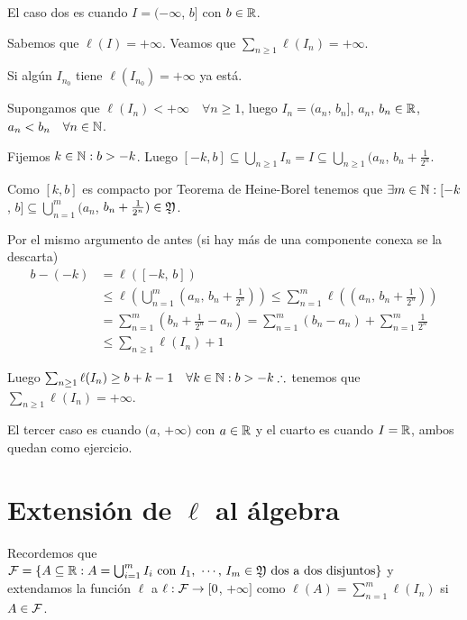 El caso dos es cuando \(I = (-\infty\), \(b]\) con \(b \in \mathbb{R}\).

Sabemos que \(\ell(I) = +\infty\). Veamos que \(\sum_{n \geq 1} \ell(I_n) = +\infty\).

Si algún \(I_{n_0}\) tiene \(\ell(I_{n_0}) = +\infty\) ya está.

Supongamos que \(\ell(I_n) < +\infty \quad \forall n \geq 1\), luego \(I_n = (a_n\), \(b_n]\), \(a_n\), \(b_n \in \mathbb{R}\), \(a_n < b_n \quad \forall n \in \mathbb{N}\).

Fijemos \(k \in \mathbb{N} : b > -k\). Luego \([-k, b] \subseteq \bigcup_{n \geq 1} I_n = I \subseteq \bigcup_{n \geq 1} (a_n\), \(b_n + \frac{1}{2^n}\).

Como \([k, b]\) es compacto por Teorema de Heine-Borel tenemos que \(\exists m \in \mathbb{N} : [-k\), \(b] \subseteq \bigcup_{n = 1}^m (a_n\), \(b_n + \frac{1}{2^n}) \in \mathfrak{Y}\).

Por el mismo argumento de antes (si hay más de una componente conexa se la descarta) \begin{align*}
    b - (-k) & = \ell([-k \text{, } b])                                                                                                     \\
             & \leq \ell(\bigcup_{n = 1}^m (a_n\text{, } b_n + \frac{1}{2^n})) \leq \sum_{n = 1}^m \ell((a_n\text{, } b_n + \frac{1}{2^n})) \\
             & = \sum_{n = 1}^m (b_n + \frac{1}{2^n} - a_n) = \sum_{n = 1}^m (b_n - a_n) + \sum_{n = 1}^m \frac{1}{2^n}                     \\
             & \leq \sum_{n \geq 1} \ell(I_n) + 1
\end{align*}

Luego \(\sum_{n \geq 1} \ell(I_n) \geq b + k - 1 \quad \forall k \in \mathbb{N} : b > -k \therefore\) tenemos que \(\sum_{n \geq 1} \ell(I_n) = +\infty\).

El tercer caso es cuando \((a\), \(+\infty)\) con \(a \in \mathbb{R}\) y el cuarto es cuando \(I = \mathbb{R}\), ambos quedan como ejercicio.

\clearpage

\section{Extensión de \(\ell\) al álgebra}

Recordemos que \(\mathcal{F} = \{ A \subseteq \mathbb{R} : A = \bigcup_{i = 1}^m I_i \text{ con } I_1 \text{, } \cdots \text{, } I_m \in \mathfrak{Y} \text{ dos a dos disjuntos} \}\) y extendamos la función
\(\ell\) a \(\ell: \mathcal{F} \to [0\), \(+\infty]\) como \(\ell(A) = \sum_{n = 1}^m \ell(I_n)\) si \(A \in \mathcal{F}\).

